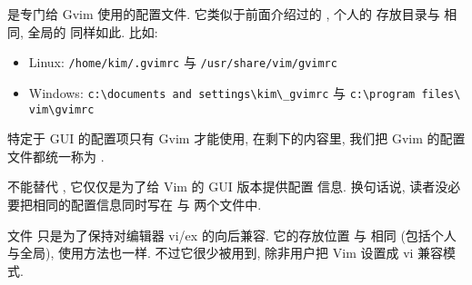  是专门给 Gvim 使用的配置文件. 它类似于前面介绍过的
, 个人的  存放目录与  相同, 全局的 
同样如此. 比如:
\begin{itemize}
    \item Linux: \texttt{/home/kim/.gvimrc} 与
        \texttt{/usr/share/vim/gvimrc}
    \item Windows: \texttt{c:\textbackslash documents and
        settings\textbackslash kim\textbackslash\_gvimrc}  与
        \texttt{c:\textbackslash program files\textbackslash
        vim\textbackslash gvimrc}
\end{itemize}
\begin{warning}
特定于 GUI 的配置项只有 Gvim 才能使用, 在剩下的内容里, 我们把 Gvim 的配置 
文件都统一称为 .
\end{warning}

 不能替代 , 它仅仅是为了给 Vim 的 GUI 版本提供配置
信息. 换句话说, 读者没必要把相同的配置信息同时写在  与
 两个文件中.

文件  只是为了保持对编辑器 vi/ex 的向后兼容. 它的存放位置
与  相同 (包括个人与全局), 使用方法也一样. 不过它很少被用到,
除非用户把 Vim 设置成 vi 兼容模式.
